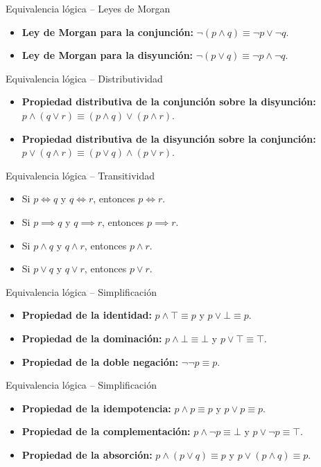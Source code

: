 \documentclass[dvisvgm,hypertex,aspectratio=169]{beamer}
\begin{document}
\begin{frame}{Equivalencia lógica -- Leyes de Morgan}
  \begin{itemize}[<+->]
    \item \textbf{Ley de Morgan para la conjunción:} $\neg (p \land q) \equiv \neg p \lor \neg q$.
    \item \textbf{Ley de Morgan para la disyunción:} $\neg (p \lor q) \equiv \neg p \land \neg q$.
  \end{itemize}
\end{frame}
\begin{frame}{Equivalencia lógica -- Distributividad}
  \begin{itemize}[<+->]
    \item \textbf{Propiedad distributiva de la conjunción sobre la disyunción:} $p \land (q \lor r) \equiv (p \land q) \lor (p \land r)$.
    \item \textbf{Propiedad distributiva de la disyunción sobre la conjunción:} $p \lor (q \land r) \equiv (p \lor q) \land (p \lor r)$.
  \end{itemize}
\end{frame}
\begin{frame}{Equivalencia lógica -- Transitividad}
  \begin{itemize}[<+->]
    \item Si $p \iff q$ y $q \iff r$, entonces $p \iff r$.
    \item Si $p \implies q$ y $q \implies r$, entonces $p \implies r$.
    \item Si $p \land q$ y $q \land r$, entonces $p \land r$.
    \item Si $p \lor q$ y $q \lor r$, entonces $p \lor r$.
  \end{itemize}
\end{frame}
\begin{frame}{Equivalencia lógica -- Simplificación}
  \begin{itemize}[<+->]
    \item \textbf{Propiedad de la identidad:} $p \land \top \equiv p$ y $p \lor \bot \equiv p$.
    \item \textbf{Propiedad de la dominación:} $p \land \bot \equiv \bot$ y $p \lor \top \equiv \top$.
    \item \textbf{Propiedad de la doble negación:} $\neg \neg p \equiv p$.
  \end{itemize}
\end{frame}
\begin{frame}{Equivalencia lógica -- Simplificación}
  \begin{itemize}[<+->]
    \item \textbf{Propiedad de la idempotencia:} $p \land p \equiv p$ y $p \lor p \equiv p$.
    \item \textbf{Propiedad de la complementación:} $p \land \neg p \equiv \bot$ y $p \lor \neg p \equiv \top$.
    \item \textbf{Propiedad de la absorción:} $p \land (p \lor q) \equiv p$ y $p \lor (p \land q) \equiv p$.
  \end{itemize}
\end{frame}
\end{document}
